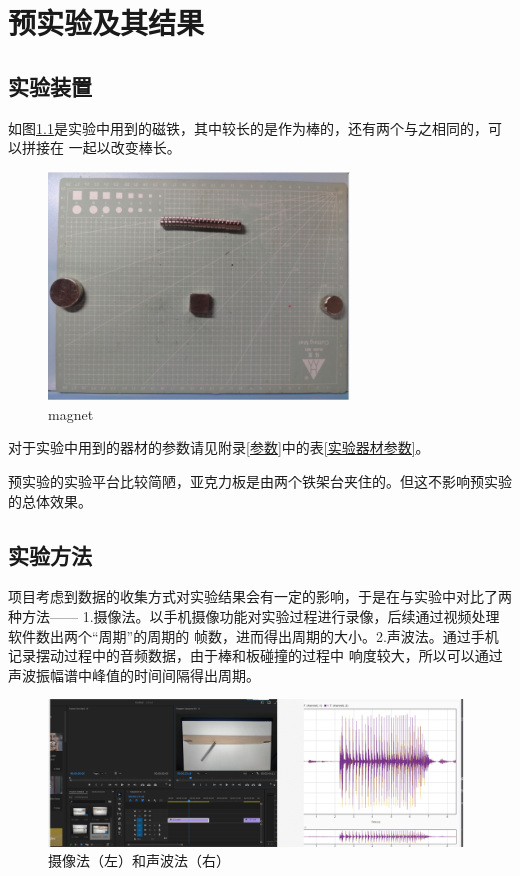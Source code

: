 \documentclass[AutoFakeBold]{LZUThesis}
\begin{document}
\chapter{预实验及其结果}
\section{实验装置}
如图\ref{magnet}是实验中用到的磁铁，其中较长的是作为棒的，还有两个与之相同的，可以拼接在
一起以改变棒长。
\begin{figure}[H]
    \centering
    \includegraphics[width=8cm]{figures/magnet.png}
    \caption{magnet}
    \label{magnet}
\end{figure}

对于实验中用到的器材的参数请见附录\ref{参数}中的表\ref{实验器材参数}。

预实验的实验平台比较简陋，亚克力板是由两个铁架台夹住的。但这不影响预实验的总体效果。

\section{实验方法}
项目考虑到数据的收集方式对实验结果会有一定的影响，于是在与实验中对比了两种方法——
1.摄像法。以手机摄像功能对实验过程进行录像，后续通过视频处理软件数出两个“周期”的周期的
帧数，进而得出周期的大小。2.声波法。通过手机记录摆动过程中的音频数据，由于棒和板碰撞的过程中
响度较大，所以可以通过声波振幅谱中峰值的时间间隔得出周期。
\begin{figure}[H]
    \centering
    \includegraphics[width=11cm]{figures/ways.png}
    \caption{摄像法（左）和声波法（右）}
    \label{ways}
\end{figure}
\end{document}
